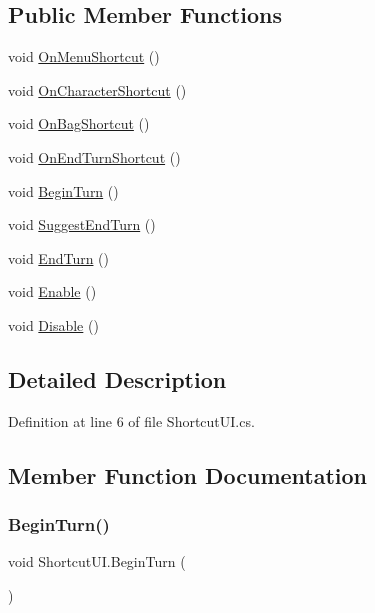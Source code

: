 \subsection*{Public Member Functions}
\begin{DoxyCompactItemize}
\item 
void \mbox{\hyperlink{class_shortcut_u_i_a71824a1037ebef08af0938c0d731a498}{On\+Menu\+Shortcut}} ()
\item 
void \mbox{\hyperlink{class_shortcut_u_i_aa9dca9d0598a36d8df6555d26e75f176}{On\+Character\+Shortcut}} ()
\item 
void \mbox{\hyperlink{class_shortcut_u_i_a2434bf0b041a115161fda12022d69f0b}{On\+Bag\+Shortcut}} ()
\item 
void \mbox{\hyperlink{class_shortcut_u_i_ac6c1705acfb6d8393f36a73810d94958}{On\+End\+Turn\+Shortcut}} ()
\item 
void \mbox{\hyperlink{class_shortcut_u_i_af20cdb51997f4ae7219a36a7bca851a3}{Begin\+Turn}} ()
\item 
void \mbox{\hyperlink{class_shortcut_u_i_a501d7c10166dca42125d04c805c617d1}{Suggest\+End\+Turn}} ()
\item 
void \mbox{\hyperlink{class_shortcut_u_i_ab2181e3a43736c065ce2ff0d8066903e}{End\+Turn}} ()
\item 
void \mbox{\hyperlink{class_shortcut_u_i_ae39ab7b830aff78693a4ddbaa3c59c3e}{Enable}} ()
\item 
void \mbox{\hyperlink{class_shortcut_u_i_a00f6fd2d64d2e5e978b749eafbe8f949}{Disable}} ()
\end{DoxyCompactItemize}


\subsection{Detailed Description}


Definition at line 6 of file Shortcut\+U\+I.\+cs.



\subsection{Member Function Documentation}
\mbox{\label{class_shortcut_u_i_af20cdb51997f4ae7219a36a7bca851a3}} 
\subsubsection{\texorpdfstring{BeginTurn()}{BeginTurn()}}
{\footnotesize\ttfamily void Shortcut\+U\+I.\+Begin\+Turn (\begin{DoxyParamCaption}{ }\end{DoxyParamCaption})}




